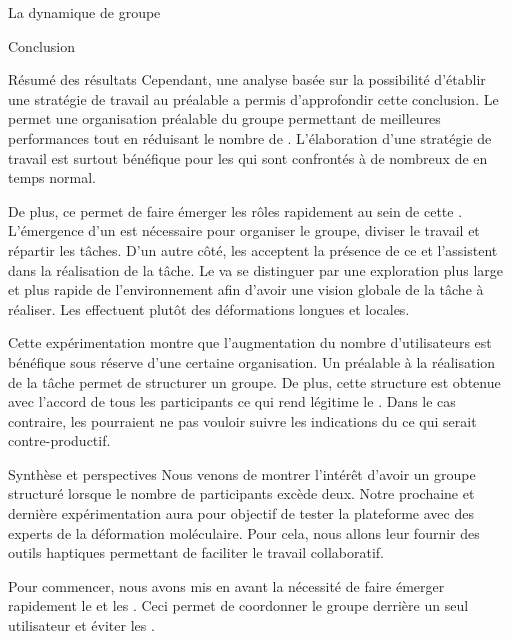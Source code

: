 \documentclass[myfrancais,ngerman,english,frenchb]{mythesis}
\begin{document}
\begin{mychapter}{La dynamique de groupe}
\begin{mysection}{Conclusion}
\begin{mysubsection}{Résumé des résultats}
				Cependant, une analyse basée sur la possibilité d'établir une stratégie de travail au préalable a permis d'approfondir cette conclusion.
				Le \mybrainstorming permet une organisation préalable du groupe permettant de meilleures performances tout en réduisant le nombre de .
				L'élaboration d'une stratégie de travail est surtout bénéfique pour les  qui sont confrontés à de nombreux de  en temps normal.

				De plus, ce \mybrainstorming permet de faire émerger les rôles rapidement au sein de cette .
				L'émergence d'un  est nécessaire pour organiser le groupe, diviser le travail et répartir les tâches.
				D'un autre côté, les  acceptent la présence de ce  et l'assistent dans la réalisation de la tâche.
				Le  va se distinguer par une exploration plus large et plus rapide de l'environnement afin d'avoir une vision globale de la tâche à réaliser.
				Les  effectuent plutôt des déformations longues et locales.

				Cette expérimentation montre que l'augmentation du nombre d'utilisateurs est bénéfique sous réserve d'une certaine organisation.
				Un \mybrainstorming préalable à la réalisation de la tâche permet de structurer un groupe.
				De plus, cette structure est obtenue avec l'accord de tous les participants ce qui rend légitime le .
				Dans le cas contraire, les  pourraient ne pas vouloir suivre les indications du  ce qui serait contre-productif.
			\end{mysubsection}
			\begin{mysubsection}{Synthèse et perspectives}
				Nous venons de montrer l'intérêt d'avoir un groupe structuré lorsque le nombre de participants excède deux.
				Notre prochaine et dernière expérimentation aura pour objectif de tester la plateforme avec des experts de la déformation moléculaire.
				Pour cela, nous allons leur fournir des outils haptiques permettant de faciliter le travail collaboratif.

				Pour commencer, nous avons mis en avant la nécessité de faire émerger rapidement le  et les .
				Ceci permet de coordonner le groupe derrière un seul utilisateur et éviter les .


\end{mysubsection}
\end{mysection}
\end{mychapter}
\end{document}
